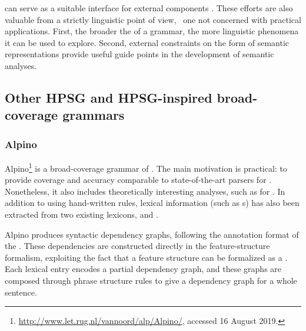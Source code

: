 \documentclass[output=paper
                ,modfonts
                ,nonflat
	        ,collection
	        ,collectionchapter
	        ,collectiontoclongg
 	        ,biblatex
                ,babelshorthands
                ,newtxmath
                ,draftmode
                ,colorlinks, citecolor=brown
]{./langsci/langscibook}
\begin{document}
can serve as a suitable interface for external
components \citep[e.g.,][]{flickinger2005sem}. 
These efforts are also valuable from a strictly linguistic point of view, \ie\ one not concerned with practical applications.
First, the broader the  of a grammar,
the more linguistic phenomena it can be used to explore.
Second, external constraints on the form of semantic representations provide
useful guide points in the development of semantic analyses.%
%


\subsection{Other HPSG and HPSG-inspired broad-coverage grammars}
\label{cl:othergrammars}

\subsubsection{Alpino}
\label{cl:other:alpino}


Alpino\footnote{%
	\url{http://www.let.rug.nl/vannoord/alp/Alpino/}, accessed 16 August 2019.
}
is a broad-coverage grammar of 
\citep{BvNM2001a-u,vannoord2005alpino,vannoord2006alpino}.
The main motivation is practical: to provide coverage and accuracy
comparable to state-of-the-art parsers for .
Nonetheless, it also includes theoretically interesting analyses,
such as for  \citep{BvN98a}.
In addition to using hand-written rules,
lexical information (such as s) has also been extracted from two existing lexicons,
 \citep{baayen1995celex}
and  \citep{kruyt1997parole}.

Alpino produces syntactic dependency graphs,
following the annotation format of the  \citep{oostdijk2000corpus}.
These dependencies are constructed directly in the feature-structure formalism,
exploiting the fact that a feature structure can be formalized as a .
Each lexical entry encodes a partial dependency graph,
and these graphs are composed through phrase structure rules
to give a dependency graph for a whole sentence.
\end{document}
